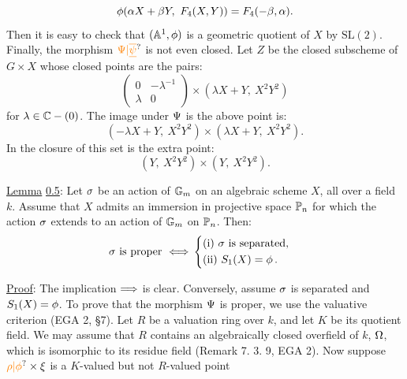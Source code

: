 \[
\handwritten{\phi}(\handwritten{\alpha}X+\handwritten{\beta}Y,\ F_4(X,Y))=F_4(-\handwritten{\beta},\handwritten{\alpha}).
\]
Then it is easy to check that $(\mathbb A^{1},\phi)$ is a geometric quotient of $X$ by $\mathrm{SL}(2)$. Finally, the morphism $\handwritten{\unsure{\Psi|\overline{\underline\psi}}}$ is not even closed. Let $Z$ be the closed subscheme of $G\times X$ whose closed points are the pairs:
\[
\begin{pmatrix}0&-\lambda^{-1}\\ \lambda&0\end{pmatrix}\times(\lambda X+Y,\ X^2Y^2)
\]
for $\lambda\in\mathbb C-(0)$. The image under $\Psi$ is the above point is:
\[
(-\lambda X+Y,\ X^2Y^2)\times(\lambda X+Y,\ X^2Y^2).
\]
In the closure of this set is the extra point:
\[
(Y,\ X^2Y^2)\times(Y,\ X^2Y^2).
\]

\uline{Lemma} \uline{0.5}: Let $\sigma$ be an action of $\mathbb G_m$ on an algebraic scheme $X$, all over a field $k$. Assume that $X$ admits an immersion in projective space $\mathbb P_n$ for which the action $\sigma$ extends to an action of $\mathbb G_m$ on $\mathbb P_n$. Then:
\[
\begin{aligned}
\sigma\text{ is proper }\Longleftrightarrow{}&
\left\{\begin{aligned}
&\text{(i) }\sigma\text{ is separated,}\\
&\text{(ii) }S_1(X)=\phi\,.
\end{aligned}\right.
\end{aligned}
\]

\uline{Proof}: The implication $\Longrightarrow$ is clear. Conversely, assume $\sigma$ is separated and $S_1(X)=\phi$. To prove that the morphism $\Psi$ is proper, we use the valuative criterion (EGA 2, \S7). Let $R$ be a valuation ring over $k$, and let $K$ be its quotient field. We may assume that $R$ contains an algebraically closed overfield of $k$, $\Omega$, which is isomorphic to its residue field (Remark 7. 3. 9, EGA 2). Now suppose $\handwritten{\unsure{\rho|\phi}}\times\handwritten{\xi}$ is a $K$-valued but not $R$-valued point
